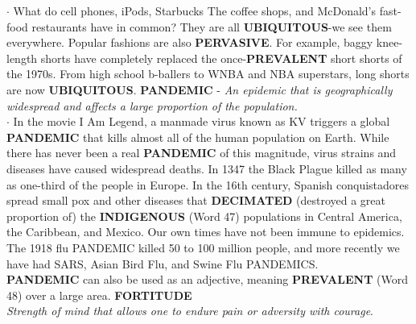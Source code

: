 \documentclass{exam}
\begin{document}
\begin{questions}
$\cdot$ What do cell phones, iPods, Starbucks The coffee shops, and McDonald's fast-food restaurants have in common? They are all \textbf{UBIQUITOUS}-we see them everywhere. Popular fashions are also \textbf{PERVASIVE}. For example, baggy knee-length shorts have completely replaced the once-\textbf{PREVALENT} short shorts of the 1970s. From high school b-ballers to WNBA and NBA superstars, long shorts are now \textbf{UBIQUITOUS}.
\question \textbf{PANDEMIC} -  \textit{An epidemic that is geographically widespread and affects a large proportion of the population.}\\ 

 $\cdot$ In the movie I Am Legend, a manmade virus known as KV triggers a global \textbf{PANDEMIC} that kills almost all of the human population on Earth. While there has never been a real \textbf{PANDEMIC} of this magnitude, virus strains and diseases have caused widespread deaths. In 1347 the Black Plague killed as many as one-third of the people in Europe. In the 16th century, Spanish conquistadores spread small pox and other diseases that \textbf{DECIMATED} (destroyed a great proportion of) the \textbf{INDIGENOUS} (Word 47) populations in Central America, the Caribbean, and Mexico. Our own times have not been immune to epidemics. The 1918 flu PANDEMIC killed 50 to 100 million people, and more recently we have had SARS, Asian Bird Flu, and Swine Flu PANDEMICS.\\ \textbf{PANDEMIC} can also be used as an adjective, meaning \textbf{PREVALENT} (Word 48) over a large area.
\question \textbf{FORTITUDE}\\  \textit{Strength of mind that allows one to endure pain or adversity with courage}.\\ 


\end{questions}
\end{document}
